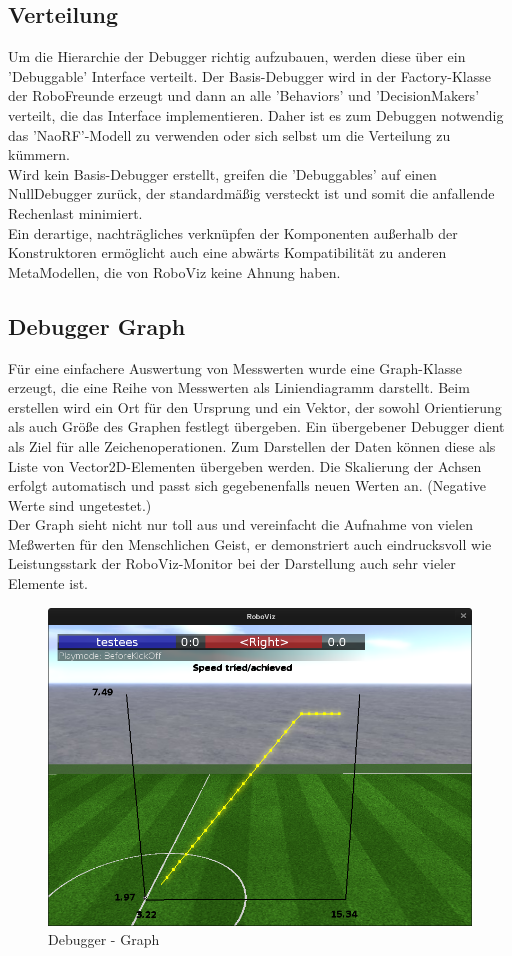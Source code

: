 \subsection{Verteilung}
\label{subsec:Debugger Verteilung}
Um die Hierarchie der Debugger richtig aufzubauen, werden diese über ein 'Debuggable' Interface verteilt. Der Basis-Debugger wird in der Factory-Klasse der RoboFreunde erzeugt und dann an alle 'Behaviors' und 'DecisionMakers' verteilt, die das Interface implementieren. Daher ist es zum Debuggen notwendig das 'NaoRF'-Modell zu verwenden oder sich selbst um die Verteilung zu kümmern.\\
Wird kein Basis-Debugger erstellt, greifen die 'Debuggables' auf einen NullDebugger zurück, der standardmäßig versteckt ist und somit die anfallende Rechenlast minimiert.\\
Ein derartige, nachträgliches verknüpfen der Komponenten außerhalb der Konstruktoren ermöglicht auch eine abwärts Kompatibilität zu anderen MetaModellen, die von RoboViz keine Ahnung haben.

\subsection{Debugger Graph}
\label{subsec:Debugger Graph}
Für eine einfachere Auswertung von Messwerten wurde eine Graph-Klasse erzeugt, die eine Reihe von Messwerten als Liniendiagramm darstellt. Beim erstellen wird ein Ort für den Ursprung und ein Vektor, der sowohl Orientierung als auch Größe des Graphen festlegt übergeben. Ein übergebener Debugger dient als Ziel für alle Zeichenoperationen. Zum Darstellen der Daten können diese als Liste von Vector2D-Elementen übergeben werden. Die Skalierung der Achsen erfolgt automatisch und passt sich gegebenenfalls neuen Werten an. (Negative Werte sind ungetestet.)\\
Der Graph sieht nicht nur toll aus und vereinfacht die Aufnahme von vielen Meßwerten für den Menschlichen Geist, er demonstriert auch eindrucksvoll wie Leistungsstark der RoboViz-Monitor bei der Darstellung auch sehr vieler Elemente ist.

\begin{figure}[H]
	\centering
	\includegraphics[width=\ScaleIfNeeded]{Grafiken/RoboViz/Graph}
	\caption{Debugger - Graph}
	\label{fig:debugger-graph}
\end{figure}
